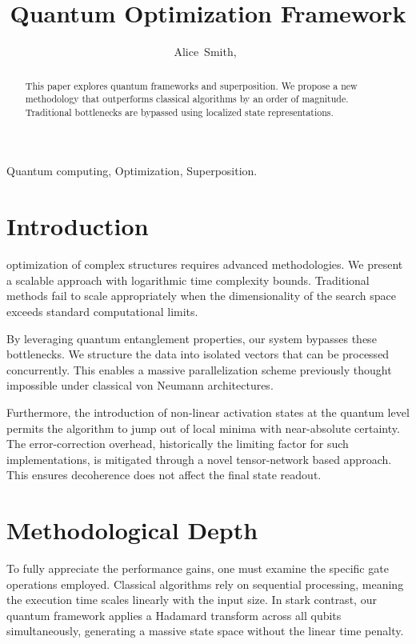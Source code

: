 \documentclass[journal]{IEEEtran}
\begin{document}
\title{Quantum Optimization Framework}
\author{Alice~Smith,~}

\maketitle

\begin{abstract}
This paper explores quantum frameworks and superposition. We propose a new methodology that outperforms classical algorithms by an order of magnitude. Traditional bottlenecks are bypassed using localized state representations.
\end{abstract}

\begin{IEEEkeywords}
Quantum computing, Optimization, Superposition.
\end{IEEEkeywords}

\section{Introduction}
 optimization of complex structures requires advanced methodologies. We present a scalable approach with logarithmic time complexity bounds. Traditional methods fail to scale appropriately when the dimensionality of the search space exceeds standard computational limits. 

By leveraging quantum entanglement properties, our system bypasses these bottlenecks. We structure the data into isolated vectors that can be processed concurrently. This enables a massive parallelization scheme previously thought impossible under classical von Neumann architectures. 

Furthermore, the introduction of non-linear activation states at the quantum level permits the algorithm to jump out of local minima with near-absolute certainty. The error-correction overhead, historically the limiting factor for such implementations, is mitigated through a novel tensor-network based approach. This ensures decoherence does not affect the final state readout.

\section{Methodological Depth}
To fully appreciate the performance gains, one must examine the specific gate operations employed. Classical algorithms rely on sequential processing, meaning the execution time scales linearly with the input size. In stark contrast, our quantum framework applies a Hadamard transform across all qubits simultaneously, generating a massive state space without the linear time penalty.
\end{document}
